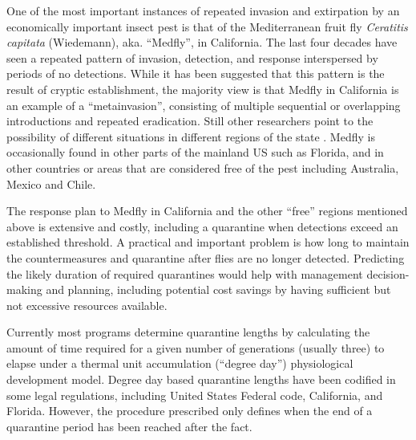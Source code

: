 \documentclass[10pt,a4paper,twocolumn]{article}
\begin{document}
One of the most important instances of repeated invasion 
and extirpation by an economically important insect pest is that of 
the Mediterranean fruit fly \textit{Ceratitis capitata} (Wiedemann), aka. ``Medfly'', 
in California.  
The last four decades have seen a repeated pattern of
invasion, detection, and response 
interspersed by periods of no detections\cite{carey_establishment_1991, papadopoulos_trickle_2013}.
While it has been suggested that this pattern is the result of
cryptic establishment\cite{carey201730}, 
the majority view is
that Medfly in California is an example of 
a ``metainvasion'', consisting of multiple sequential or
overlapping introductions\cite{davies_bioinvasions_1999}
and repeated eradication\cite{haymer_genetic_1997}.
Still other researchers point to the possibility of different situations
in different regions of the state
\cite{bonizzoni_microsatellite_2001,gasperi_genetic_2002}.
Medfly is occasionally found in 
other parts of the mainland US such as Florida\cite{szyniszewska2016analysis},
and in other countries or areas that are considered 
free of the pest including Australia, Mexico and Chile\cite{mcinnis2017can}.

The response plan to Medfly in California and the other ``free'' 
regions mentioned above is extensive and costly, 
including a quarantine when detections exceed an established threshold\cite{gilbert_insect_2013}.
A practical and important problem is how long to maintain 
the countermeasures and quarantine after flies are no longer detected.
Predicting the likely duration of required quarantines would help with
management decision-making and planning,
including potential cost savings by having sufficient but not excessive
resources available.

Currently most programs determine quarantine lengths 
by calculating the amount of time required for a given number 
of generations (usually three) to elapse under a thermal unit accumulation (``degree day'')
physiological development model.
Degree day based quarantine lengths have been codified in some legal
regulations, including 
United States Federal code\cite{US-301.32-10},
California\cite{3-CA-ADC-3406}, and Florida.
However, the procedure prescribed only defines when the end of a
quarantine period has been reached after the fact.
\end{document}
